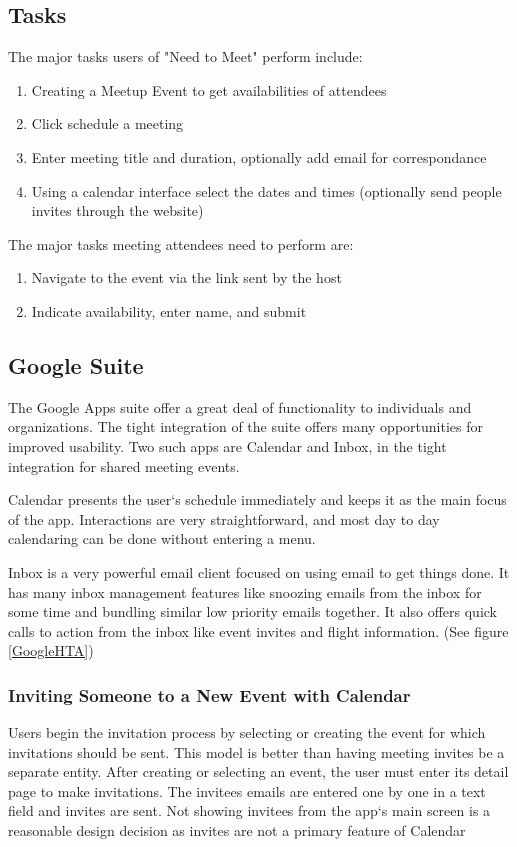 \documentclass{sigchi}
\begin{document}
\subsection{Tasks}
The major tasks users of "Need to Meet" perform include: 
\begin{enumerate}
\item Creating a Meetup Event to get availabilities of attendees
\item Click schedule a meeting
\item Enter meeting title and duration, optionally add email for correspondance
\item Using a calendar interface select the dates and times (optionally 
send people invites through the website)
\end{enumerate}
The major tasks meeting attendees need to perform are: 
\begin{enumerate}
\item Navigate to the event via the link sent by the host
\item Indicate availability, enter name, and submit
\end{enumerate}
\FloatBarrier
\subsection{Google Suite}
\FloatBarrier

The Google Apps suite offer a great deal of functionality to individuals and organizations.
The tight integration of the suite offers many opportunities for improved usability.
Two such apps are Calendar and Inbox, in the tight integration for shared meeting events. 

Calendar presents the user`s schedule immediately and keeps it as the main focus of the app.
Interactions are very straightforward, and most day to day calendaring can be done without entering a menu.

Inbox is a very powerful email client focused on using email to get things done.
It has many inbox management features like snoozing emails from the inbox for some time and bundling similar low priority emails together.
It also offers quick calls to action from the inbox like event invites and flight information. (See figure \ref{GoogleHTA})

\subsubsection{Inviting Someone to a New Event with Calendar}
Users begin the invitation process by selecting or creating the event for which invitations should be sent.
This model is better than having meeting invites be a separate entity.
After creating or selecting an event, the user must enter its detail page to make invitations.
The invitees emails are entered one by one in a text field and invites are sent.
Not showing invitees from the app`s main screen is a reasonable design decision as invites are not a primary feature of Calendar
\end{document}
